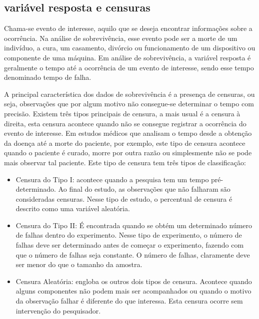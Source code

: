 \documentclass[a4paper,12pt]{article}
\begin{document}
\subsection{variável resposta e censuras}
Chama-se evento de interesse, aquilo que se deseja encontrar informações sobre a ocorrência. Na análise de sobrevivência, esse evento pode ser a morte de um indivíduo, a cura, um casamento, divórcio ou funcionamento de um dispositivo ou componente de uma máquina. Em análise de sobrevivência, a variável resposta é geralmente o tempo até a ocorrência de um evento de interesse, sendo esse tempo denominado tempo de falha.%

A principal característica dos dados de sobrevivência é a presença de censuras, ou seja, observações que por algum motivo não consegue-se determinar o tempo com precisão. Existem três tipos principais de censura, a mais usual é a censura à direita, esta censura acontece quando não se consegue registrar a ocorrência do evento de interesse. Em estudos médicos que analisam o tempo desde a obtenção da doença até a morte do paciente, por exemplo, este tipo de censura acontece quando o paciente é curado, morre por outra razão ou simplesmente não se pode mais observar tal paciente. Este tipo de censura tem três tipos de classificação:

\begin{itemize}
	\item Censura do Tipo I: acontece quando a pesquisa tem um tempo pré-determinado. Ao final do estudo, as observações que não falharam são consideradas censuras. Nesse tipo de estudo, o percentual de censura é descrito como uma variável aleatória.
	
	\item Censura do Tipo II: É encontrada quando se obtém um determinado número de falhas dentro do experimento. Nesse tipo de experimento, o número de falhas deve ser determinado antes de começar o experimento, fazendo com que o número de falhas seja constante. O número de falhas, claramente deve ser menor do que o tamanho da amostra.
	
	\item Censura Aleatória: engloba os outros dois tipos de censura. Acontece quando alguns componentes não podem mais ser acompanhados ou quando o motivo da observação falhar é diferente do que interessa. Esta censura ocorre sem intervenção do pesquisador.

\end{itemize}
\end{document}
